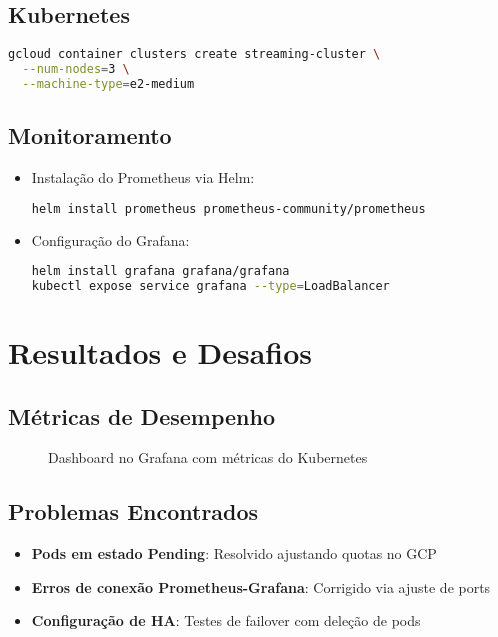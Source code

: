 \documentclass[12pt, a4paper]{article}
\begin{document}
\subsection{Kubernetes}
\begin{lstlisting}[language=bash,caption=Comandos de implantação no GKE]
gcloud container clusters create streaming-cluster \
  --num-nodes=3 \
  --machine-type=e2-medium
\end{lstlisting}

\subsection{Monitoramento}
\begin{itemize}
    \item Instalação do Prometheus via Helm:
\begin{lstlisting}[language=bash]
helm install prometheus prometheus-community/prometheus
\end{lstlisting}

    \item Configuração do Grafana:
\begin{lstlisting}[language=bash]
helm install grafana grafana/grafana
kubectl expose service grafana --type=LoadBalancer
\end{lstlisting}
\end{itemize}

\section{Resultados e Desafios}

\subsection{Métricas de Desempenho}
\begin{figure}[h]
    \centering
    \caption{Dashboard no Grafana com métricas do Kubernetes}
    \label{fig:dashboard}
\end{figure}

\subsection{Problemas Encontrados}
\begin{itemize}
    \item \textbf{Pods em estado Pending}: Resolvido ajustando quotas no GCP
    \item \textbf{Erros de conexão Prometheus-Grafana}: Corrigido via ajuste de ports
    \item \textbf{Configuração de HA}: Testes de failover com deleção de pods
\end{itemize}
\end{document}

